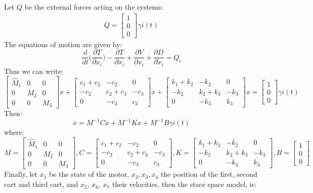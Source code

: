 Let $Q$ be the external forces acting on the systems:
\begin{align*}
Q =\begin{bmatrix} 1 \\ 0 \\ 0 \end{bmatrix} \gamma i(t)
\end{align*}
The equations of motion are given by:
$$\frac{d}{dt}\Big(\frac{\partial T}{\partial x_i} \Big) -\frac{\partial T}{\partial \dot{x}_i} + \frac{\partial V}{\partial x_i} + \frac{\partial D}{\partial \dot{x}_i} = Q_i$$
Thus we can write:
$$
\begin{bmatrix}
\hat{M}_1 & 0 & 0 \\
0 & M_2 & 0 \\
0 & 0 & M_3
\end{bmatrix}
\ddot{x} + 
\begin{bmatrix}
c_1+c_2 & -c_2 &0 \\
-c_2 & c_2+c_3 & -c_3 \\
0 & -c_3 & c_3
\end{bmatrix}
\dot{x}+
\begin{bmatrix}
k_1+k_2 & -k_2  &0\\
-k_2 & k_2+k_3 & -k_3 \\
0 & -k_3 & k_3
\end{bmatrix}
x = \begin{bmatrix} 1 \\ 0 \\ 0\end{bmatrix}\gamma i(t)$$
Then:
$$\ddot{x} = M^{-1}C\dot{x}+M^{-1}Kx+ M^{-1}B\gamma i(t)$$
where:
$$M=\begin{bmatrix}
\hat{M}_1 & 0 & 0 \\
0 & M_2 & 0 \\
0 & 0 & M_3
\end{bmatrix}, C=\begin{bmatrix}
c_1+c_2 & -c_2 &0 \\
-c_2 & c_2+c_3 & -c_3 \\
0 & -c_3 & c_3
\end{bmatrix}, K=\begin{bmatrix}
k_1+k_2 & -k_2  &0\\
-k_2 & k_2+k_3 & -k_3 \\
0 & -k_3 & k_3
\end{bmatrix}, B=\begin{bmatrix}1\\ 0 \\0 \end{bmatrix}$$
Finally, let $x_1$ be the state of the motor, $x_2,x_3,x_4$ the position of the first, second cart and third cart, and $x_5$, $x_6$, $x_7$ their velocities, then the stace space model, is:

